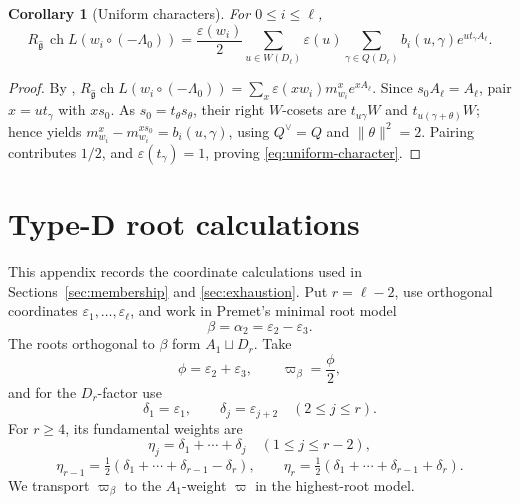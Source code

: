 \documentclass[11pt]{amsart}
\newtheorem{corollary}[theorem]{Corollary}
\theoremstyle{remark}
\numberwithin{equation}{section}
\begin{document}
\begin{corollary}[Uniform characters]
\label{cor:uniform-characters}
For \(0\le i\le\ell\),
\begin{equation}
\label{eq:uniform-character}
   R_{\widehat{\mathfrak g}}\,
   \operatorname{ch}L\!\left(w_i\circ(-\Lambda_0)\right)
   =
   \frac{\varepsilon(w_i)}2
   \sum_{u\in W(D_\ell)}\varepsilon(u)
   \sum_{\gamma\in Q(D_\ell)}
   b_i(u,\gamma)e^{u t_\gamma A_\ell}.
\end{equation}
\end{corollary}

\begin{proof}
By \cite[Proposition~3.6 and Lemma~A.3]{BezrukavnikovKacKrylov2024},
\(R_{\widehat{\mathfrak g}}\operatorname{ch}L(w_i\circ(-\Lambda_0))
=\sum_x\varepsilon(xw_i)m^x_{w_i}e^{xA_\ell}\).  Since
\(s_0A_\ell=A_\ell\), pair \(x=ut_\gamma\) with \(xs_0\).  As
\(s_0=t_\theta s_\theta\), their right \(W\)-cosets are
\(t_{u\gamma}W\) and \(t_{u(\gamma+\theta)}W\); hence
\cite[Proposition~A.6 and Equation~(31)]{BezrukavnikovKacKrylov2024} yields
\(m^x_{w_i}-m^{xs_0}_{w_i}=b_i(u,\gamma)\), using
\(Q^\vee=Q\) and \(\lVert\theta\rVert^2=2\).  Pairing contributes
\(1/2\), and \(\varepsilon(t_\gamma)=1\), proving
\eqref{eq:uniform-character}.
\end{proof}

\appendix
\section{Type-D root calculations}
\label{app:type-D-calculations}

This appendix records the coordinate calculations used in
Sections~\ref{sec:membership} and \ref{sec:exhaustion}.  Put
\(r=\ell-2\), use orthogonal coordinates
\(\varepsilon_1,\ldots,\varepsilon_\ell\), and work in Premet's minimal
root model
\[
   \beta=\alpha_2=\varepsilon_2-\varepsilon_3.
\]
The roots orthogonal to \(\beta\) form \(A_1\sqcup D_r\).  Take
\[
   \phi=\varepsilon_2+\varepsilon_3,
   \qquad
   \varpi_\beta=\frac{\phi}{2},
\]
and for the \(D_r\)-factor use
\begin{equation}
   \delta_1=\varepsilon_1,
   \qquad
   \delta_j=\varepsilon_{j+2}\quad(2\le j\le r).
\end{equation}
For \(r\ge4\), its fundamental weights are
\[
   \eta_j=\delta_1+\cdots+\delta_j\quad(1\le j\le r-2),
\]
\[
   \eta_{r-1}=\tfrac12(\delta_1+\cdots+\delta_{r-1}-\delta_r),
   \qquad
   \eta_r=\tfrac12(\delta_1+\cdots+\delta_{r-1}+\delta_r).
\]
We transport \(\varpi_\beta\) to the \(A_1\)-weight \(\varpi\) in the
highest-root model.
\end{document}
